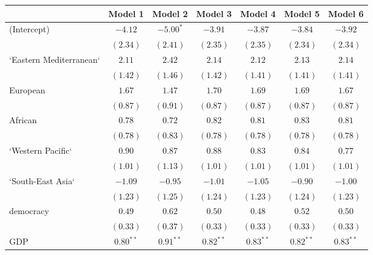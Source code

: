 
\begin{table}[!h]
\begin{center}
\begin{tabular}{l c c c c c c }
\toprule
 & Model 1 & Model 2 & Model 3 & Model 4 & Model 5 & Model 6 \\
\midrule
(Intercept)             & $-4.12$      & $-5.00^{*}$  & $-3.91$      & $-3.87$      & $-3.84$      & $-3.92$      \\
                        & $(2.34)$     & $(2.41)$     & $(2.35)$     & $(2.35)$     & $(2.34)$     & $(2.34)$     \\
`Eastern Mediterranean` & $2.11$       & $2.42$       & $2.14$       & $2.12$       & $2.13$       & $2.14$       \\
                        & $(1.42)$     & $(1.46)$     & $(1.42)$     & $(1.41)$     & $(1.41)$     & $(1.41)$     \\
European                & $1.67$       & $1.47$       & $1.70$       & $1.69$       & $1.69$       & $1.67$       \\
                        & $(0.87)$     & $(0.91)$     & $(0.87)$     & $(0.87)$     & $(0.87)$     & $(0.87)$     \\
African                 & $0.78$       & $0.72$       & $0.82$       & $0.81$       & $0.83$       & $0.81$       \\
                        & $(0.78)$     & $(0.83)$     & $(0.78)$     & $(0.78)$     & $(0.78)$     & $(0.78)$     \\
`Western Pacific`       & $0.90$       & $0.87$       & $0.88$       & $0.83$       & $0.84$       & $0.77$       \\
                        & $(1.01)$     & $(1.13)$     & $(1.01)$     & $(1.01)$     & $(1.01)$     & $(1.01)$     \\
`South-East Asia`       & $-1.09$      & $-0.95$      & $-1.01$      & $-1.05$      & $-0.90$      & $-1.00$      \\
                        & $(1.23)$     & $(1.25)$     & $(1.24)$     & $(1.23)$     & $(1.24)$     & $(1.23)$     \\
democracy               & $0.49$       & $0.62$       & $0.50$       & $0.48$       & $0.52$       & $0.50$       \\
                        & $(0.33)$     & $(0.37)$     & $(0.33)$     & $(0.33)$     & $(0.33)$     & $(0.33)$     \\
GDP                     & $0.80^{**}$  & $0.91^{**}$  & $0.82^{**}$  & $0.83^{**}$  & $0.82^{**}$  & $0.83^{**}$  \\

\end{tabular}
\end{center}
\end{table}
